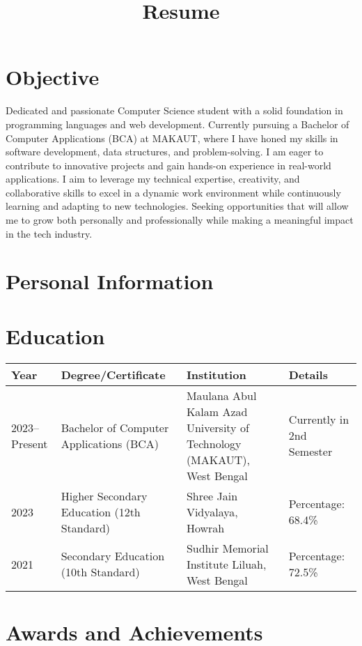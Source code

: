 \documentclass[11pt,a4paper,sans]{moderncv}
\title{Resume}
\begin{document}
\makecvtitle

\section{Objective}
Dedicated and passionate Computer Science student with a solid foundation in programming languages and web development. Currently pursuing a Bachelor of Computer Applications (BCA) at MAKAUT, where I have honed my skills in software development, data structures, and problem-solving. I am eager to contribute to innovative projects and gain hands-on experience in real-world applications. I aim to leverage my technical expertise, creativity, and collaborative skills to excel in a dynamic work environment while continuously learning and adapting to new technologies. Seeking opportunities that will allow me to grow both personally and professionally while making a meaningful impact in the tech industry.

\section{Personal Information}


\section{Education}
\begin{tabular}{ | p{2cm} | p{6cm} | p{7cm} | p{4cm} | }
  \hline
  \textbf{Year} & \textbf{Degree/Certificate} & \textbf{Institution} & \textbf{Details} \\
  \hline
  2023--Present & Bachelor of Computer Applications (BCA) & Maulana Abul Kalam Azad University of Technology (MAKAUT), West Bengal & Currently in 2nd Semester \\
  \hline
  2023 & Higher Secondary Education (12th Standard) & Shree Jain Vidyalaya, Howrah & Percentage: 68.4\% \\
  \hline
  2021 & Secondary Education (10th Standard) & Sudhir Memorial Institute Liluah, West Bengal & Percentage: 72.5\% \\
  \hline
\end{tabular}

\section{Awards and Achievements} %
\end{document}
